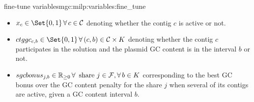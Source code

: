 \begin{definition}{\MGC{} fine-tune variables}{mgc:milp:variables:fine_tune}
  \begin{itemize}
    \item \(x_c \in \Set{0, 1} \, \forall c \in \Contigs{}\) denoting whether the contig \(c\) is active or not.
    \item \(\ctggc{c}{b} \in \Set{0, 1} \, \forall (c, b) \in \Contigs{} \times K\) denoting whether the contig \(c\) participates in the solution and the plasmid GC content is in the interval \(b\) or not.
    \item \(\sgcbonus{j}{b} \in \Reals_{\geq 0} \, \forall \text{ share } j \in \Fragments{}, \forall b \in K\) corresponding to the best GC bonus over the GC content penalty for the share \(j\) when several of its contigs are active, given a GC content interval \(b\).
  \end{itemize}
\end{definition}


